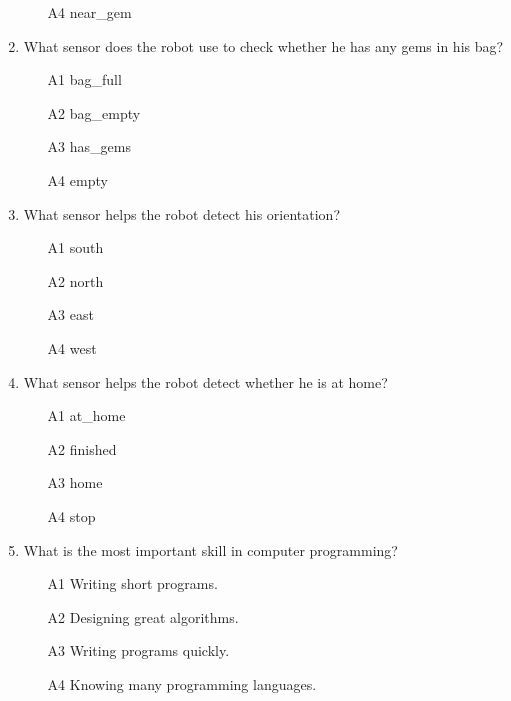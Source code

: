 \documentclass[article,A4,12pt]{llncs}
\begin{document}
\begin{enumerate}
\begin{enumerate}
\item[A4] near\_gem
\end{enumerate}
\item What sensor does the robot use to check whether he has any gems in his bag?
\begin{enumerate}
\item[A1] bag\_full
\item[A2] bag\_empty
\item[A3] has\_gems
\item[A4] empty
\end{enumerate}
\item What sensor helps the robot detect his orientation?
\begin{enumerate}
\item[A1] south
\item[A2] north
\item[A3] east
\item[A4] west
\end{enumerate}
\item What sensor helps the robot detect whether he is at home?
\begin{enumerate}
\item[A1] at\_home
\item[A2] finished
\item[A3] home
\item[A4] stop
\end{enumerate}
\item What is the most important skill in computer programming?
\begin{enumerate}
\item[A1] Writing short programs.
\item[A2] Designing great algorithms.
\item[A3] Writing programs quickly.
\item[A4] Knowing many programming languages.
\end{enumerate}
\end{enumerate}

%
%
%
%
\end{document}
